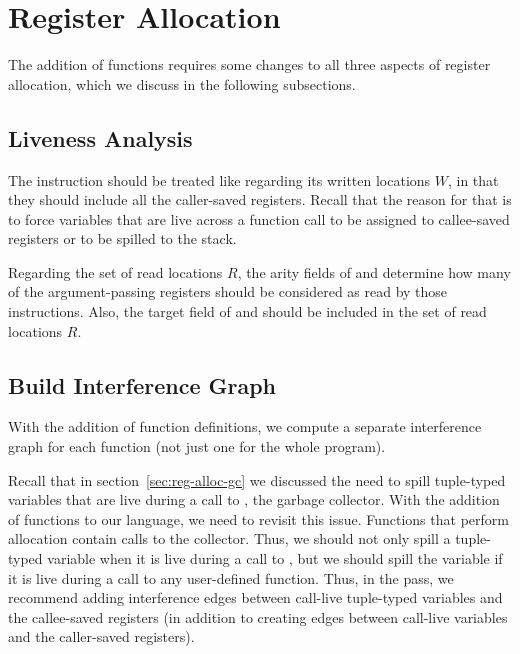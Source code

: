 \documentclass[7x10]{TimesAPriori_MIT}%
\numberwithin{theorem}{chapter}
\numberwithin{definition}{chapter}
\numberwithin{equation}{chapter}
\begin{document}
\section{Register Allocation}
\label{sec:register-allocation-r4}

The addition of functions requires some changes to all three aspects
of register allocation, which we discuss in the following subsections.

\subsection{Liveness Analysis}
\label{sec:liveness-analysis-r4}


The  instruction should be treated like
 regarding its written locations $W$, in that they should
include all the caller-saved registers. Recall that the reason for
that is to force variables that are live across a function call to be assigned to callee-saved
registers or to be spilled to the stack.

Regarding the set of read locations $R$, the arity fields of
 and  determine how many of the
argument-passing registers should be considered as read by those
instructions. Also, the target field of  and
 should be included in the set of read locations
$R$.

\subsection{Build Interference Graph}
\label{sec:build-interference-r4}

With the addition of function definitions, we compute a separate interference
graph for each function (not just one for the whole program).

Recall that in section~\ref{sec:reg-alloc-gc} we discussed the need to
spill tuple-typed variables that are live during a call to
, the garbage collector.  With the addition of functions
to our language, we need to revisit this issue. Functions that perform
allocation contain calls to the collector. Thus, we should not only
spill a tuple-typed variable when it is live during a call to
, but we should spill the variable if it is live during
a call to any user-defined function. Thus, in the
 pass, we recommend adding interference
edges between call-live tuple-typed variables and the callee-saved
registers (in addition to creating edges between
call-live variables and the caller-saved registers).
\end{document}
